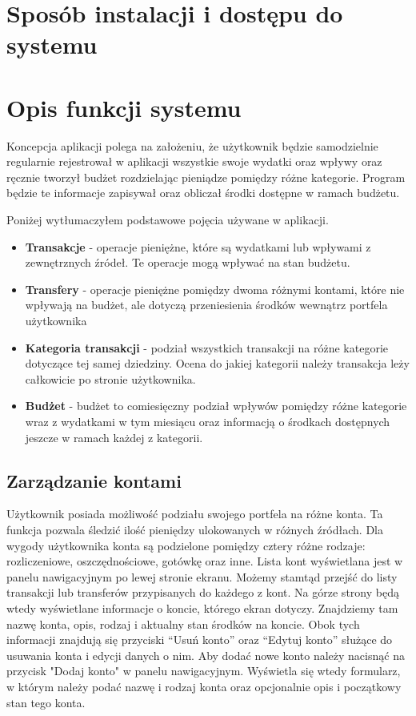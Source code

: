 \documentclass[shortabstract,inz]{iithesis}
\begin{document}
\section{Sposób instalacji i dostępu do systemu}
\section{Opis funkcji systemu}
Koncepcja aplikacji polega na założeniu, że użytkownik będzie samodzielnie regularnie rejestrował w aplikacji wszystkie swoje wydatki oraz wpływy oraz ręcznie tworzył budżet rozdzielając pieniądze pomiędzy różne kategorie. Program będzie te informacje zapisywał oraz obliczał środki dostępne w ramach budżetu.

Poniżej wytłumaczyłem podstawowe pojęcia używane w aplikacji.
\begin{itemize}
	\item \textbf{Transakcje} - operacje pieniężne, które są wydatkami lub wpływami z zewnętrznych źródeł. Te operacje mogą wpływać na stan budżetu.
	\item \textbf{Transfery} - operacje pieniężne pomiędzy dwoma różnymi kontami, które nie wpływają na budżet, ale dotyczą przeniesienia środków wewnątrz portfela użytkownika
		\item \textbf{Kategoria transakcji} - podział wszystkich transakcji na różne kategorie dotyczące tej samej dziedziny. Ocena do jakiej kategorii należy transakcja leży całkowicie po stronie użytkownika.
	\item \textbf{Budżet} - budżet to comiesięczny podział wpływów pomiędzy różne kategorie wraz z wydatkami w tym miesiącu oraz informacją o środkach dostępnych jeszcze w ramach każdej z kategorii.

\end{itemize}
\subsection{Zarządzanie kontami}
Użytkownik posiada możliwość podziału swojego portfela na różne konta. Ta funkcja pozwala śledzić ilość pieniędzy ulokowanych w różnych źródłach. Dla wygody użytkownika konta są podzielone pomiędzy cztery różne rodzaje: rozliczeniowe, oszczędnościowe, gotówkę oraz inne. Lista kont wyświetlana jest w panelu nawigacyjnym po lewej stronie ekranu. Możemy stamtąd przejść do listy transakcji lub transferów przypisanych do każdego z kont. Na górze strony będą wtedy wyświetlane informacje o koncie, którego ekran dotyczy. Znajdziemy tam nazwę konta, opis, rodzaj i aktualny stan środków na koncie. Obok tych informacji znajdują się przyciski ``Usuń konto'' oraz ``Edytuj konto'' służące do usuwania konta i edycji danych o nim. Aby dodać nowe konto należy nacisnąć na przycisk "Dodaj konto" w panelu nawigacyjnym. Wyświetla się wtedy formularz, w którym należy podać nazwę i rodzaj konta oraz opcjonalnie opis i początkowy stan tego konta.
\end{document}
